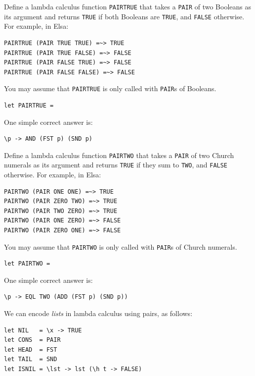 \documentclass[addpoints]{exam}
\begin{document}
\begin{questions}
Define a lambda calculus function \texttt{PAIRTRUE} that takes a \texttt{PAIR} of two Booleans as its argument and returns \texttt{TRUE} if both Booleans are \texttt{TRUE}, and \texttt{FALSE} otherwise.  For example, in Elsa:

\begin{verbatim}
PAIRTRUE (PAIR TRUE TRUE) =~> TRUE
PAIRTRUE (PAIR TRUE FALSE) =~> FALSE
PAIRTRUE (PAIR FALSE TRUE) =~> FALSE
PAIRTRUE (PAIR FALSE FALSE) =~> FALSE
\end{verbatim}

You may assume that \texttt{PAIRTRUE} is only called with \texttt{PAIR}s of Booleans.

\begin{verbatim}
let PAIRTRUE = 
\end{verbatim}
\begin{solutionorbox}[1.5in]
One simple correct answer is:
\begin{verbatim}
\p -> AND (FST p) (SND p)
\end{verbatim}
\end{solutionorbox}

\question[4]

Define a lambda calculus function \texttt{PAIRTWO} that takes a \texttt{PAIR} of two Church numerals as its argument and returns \texttt{TRUE} if they sum to \texttt{TWO}, and \texttt{FALSE} otherwise.  For example, in Elsa:

\begin{verbatim}
PAIRTWO (PAIR ONE ONE) =~> TRUE
PAIRTWO (PAIR ZERO TWO) =~> TRUE
PAIRTWO (PAIR TWO ZERO) =~> TRUE
PAIRTWO (PAIR ONE ZERO) =~> FALSE
PAIRTWO (PAIR ZERO ONE) =~> FALSE
\end{verbatim}

You may assume that \texttt{PAIRTWO} is only called with \texttt{PAIR}s of Church numerals.

\begin{verbatim}
let PAIRTWO = 
\end{verbatim}
\begin{solutionorbox}[1.5in]
One simple correct answer is:
\begin{verbatim}
\p -> EQL TWO (ADD (FST p) (SND p))
\end{verbatim}
\end{solutionorbox}

\newpage

\question We can encode \emph{lists} in lambda calculus using pairs, as follows:

\begin{verbatim}
let NIL   = \x -> TRUE
let CONS  = PAIR
let HEAD  = FST
let TAIL  = SND
let ISNIL = \lst -> lst (\h t -> FALSE)
\end{verbatim}


\end{questions}
\end{document}
